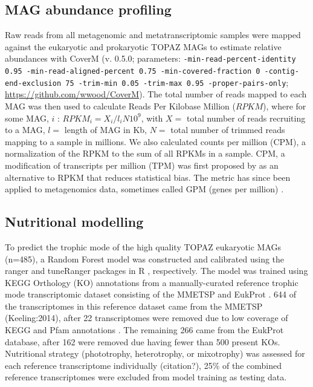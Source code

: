 \documentclass[12pt]{article}
\numberwithin{equation}{section}
\begin{document}
\subsection*{MAG abundance profiling} 

Raw reads from all metagenomic and metatranscriptomic samples were mapped against the eukaryotic and prokaryotic TOPAZ MAGs to estimate relative abundances with CoverM (v. 0.5.0; parameters: \texttt{-min-read-percent-identity 0.95 -min-read-aligned-percent 0.75  -min-covered-fraction 0 -contig-end-exclusion 75 -trim-min 0.05 -trim-max 0.95  -proper-pairs-only}; \url{https://github.com/wwood/CoverM}). The total number of reads mapped to each MAG was then used to calculate Reads Per Kilobase Million ($RPKM$), where for some MAG, $i$ :  $RPKM_i = {X_i}/{l_iN}10^9$, with $X =$ total number of reads recruiting to a MAG, $l =$ length of MAG in Kb, $N =$ total number of trimmed reads mapping to a sample in millions. We also calculated counts per million (CPM), a normalization of the RPKM to the sum of all RPKMs in a sample. CPM, a modification of transcripts per million (TPM) was first proposed by \citet{Wagner_2012} as an alternative to RPKM that reduces statistical bias. The metric has since been applied to metagenomics data, sometimes called GPM (genes per million) \citep{Gradoville_2017}. 

\subsection*{Nutritional modelling} 

To predict the trophic mode of the high quality TOPAZ eukaryotic MAGs (n=485), a Random Forest model \citep{Breiman_2001} was constructed and calibrated using the ranger \citep{Wright_2017} and tuneRanger packages in R \citep{tuneRanger}, respectively. The model was trained using KEGG Orthology (KO) annotations \citep{Kanehisa_2019} from a manually-curated reference trophic mode transcriptomic dataset consisting of the MMETSP \citep{Keeling2014} and EukProt \citep{Richter2020EukProt}. 644 of the transcriptomes in this reference dataset came from the MMETSP (Keeling:2014), after 22 transcriptomes were removed due to low coverage of KEGG and Pfam annotations \citep{Finn2014Pfam}. The remaining 266 came from the EukProt database, after 162 were removed due having fewer than 500 present KOs. Nutritional strategy (phototrophy, heterotrophy, or mixotrophy) was assessed for each reference transcriptome individually (citation?), 25\% of the combined reference transcriptomes were excluded from model training as testing data. 
\end{document}
